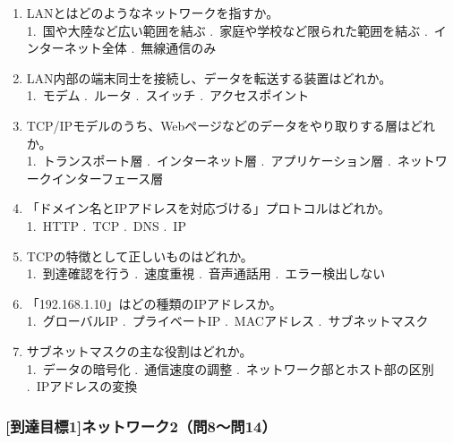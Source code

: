 \documentclass[b4paper,7pt,twocolumn,landscape]{jsarticle}
\begin{document}
\begin{enumerate}
\item LANとはどのようなネットワークを指すか。\\
1.~国や大陸など広い範囲を結ぶ .~家庭や学校など限られた範囲を結ぶ .~インターネット全体 .~無線通信のみ

\item LAN内部の端末同士を接続し、データを転送する装置はどれか。\\
1.~モデム .~ルータ .~スイッチ .~アクセスポイント

\item TCP/IPモデルのうち、Webページなどのデータをやり取りする層はどれか。\\
1.~トランスポート層 .~インターネット層 .~アプリケーション層 .~ネットワークインターフェース層

\item 「ドメイン名とIPアドレスを対応づける」プロトコルはどれか。\\
1.~HTTP .~TCP .~DNS .~IP

\item TCPの特徴として正しいものはどれか。\\
1.~到達確認を行う .~速度重視 .~音声通話用 .~エラー検出しない

\item 「192.168.1.10」はどの種類のIPアドレスか。\\
1.~グローバルIP .~プライベートIP .~MACアドレス .~サブネットマスク

\item サブネットマスクの主な役割はどれか。\\
1.~データの暗号化 .~通信速度の調整 .~ネットワーク部とホスト部の区別 .~IPアドレスの変換
\end{enumerate}



\subsubsection*{[到達目標1]ネットワーク2（問8〜問14）}
\end{document}
